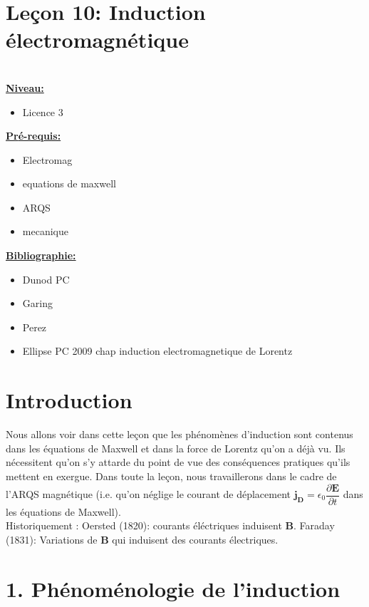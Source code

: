 \documentclass[french, a4paper, 10pt, twocolumn, landscape]{article}
\begin{document}
\section*{Leçon 10: Induction électromagnétique}

\hrulefill\\

\noindent\underline{\textbf{Niveau:}}
\begin{itemize}
  \item Licence 3 
\end{itemize}
\underline{\textbf{Pr{\'e}-requis: }}

\begin{itemize}  
\item Electromag 
\item equations de maxwell
\item ARQS
\item mecanique
\end{itemize}
\underline{\textbf{Bibliographie:}}

\begin{itemize}
  \item Dunod PC
  \item Garing
  \item Perez
  \item Ellipse PC 2009 chap induction electromagnetique de Lorentz
\end{itemize}
\hrulefill

\section* {Introduction}

Nous allons voir dans cette leçon que les phénomènes d'induction sont contenus dans les équations de Maxwell et dans la force de Lorentz qu'on a déjà vu. Ils nécessitent qu'on s'y attarde du point de vue des conséquences pratiques qu'ils mettent en exergue. Dans toute la leçon, nous travaillerons dans le cadre de l'ARQS magnétique (i.e. qu'on néglige le courant de déplacement $\mathbf{j_D}=\epsilon_0\dfrac{\partial \mathbf{E}}{\partial t}$ dans les équations de Maxwell).\\
  
  Historiquement : Oersted (1820): courants éléctriques induisent $\mathbf B$. Faraday (1831): Variations de $\mathbf B$ qui induisent des courants électriques. 

  \section*{1. Phénoménologie de l'induction}
\end{document}
